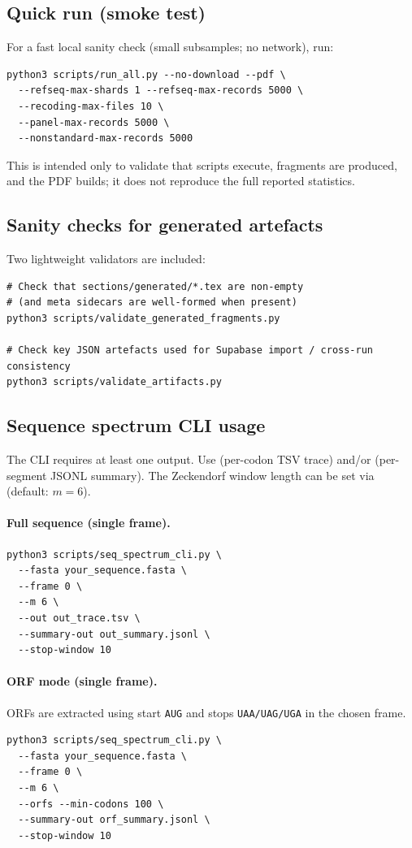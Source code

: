 \subsection{Quick run (smoke test)}
For a fast local sanity check (small subsamples; no network), run:
\begin{verbatim}
python3 scripts/run_all.py --no-download --pdf \
  --refseq-max-shards 1 --refseq-max-records 5000 \
  --recoding-max-files 10 \
  --panel-max-records 5000 \
  --nonstandard-max-records 5000
\end{verbatim}
This is intended only to validate that scripts execute, fragments are produced, and the PDF builds; it does not reproduce the full reported statistics.

\subsection{Sanity checks for generated artefacts}
Two lightweight validators are included:
\begin{verbatim}
# Check that sections/generated/*.tex are non-empty
# (and meta sidecars are well-formed when present)
python3 scripts/validate_generated_fragments.py

# Check key JSON artefacts used for Supabase import / cross-run consistency
python3 scripts/validate_artifacts.py
\end{verbatim}

\subsection{Sequence spectrum CLI usage}
The CLI requires at least one output. Use  (per-codon TSV trace) and/or  (per-segment JSONL summary).
The Zeckendorf window length can be set via  (default: $m=6$).

\paragraph{Full sequence (single frame).}
\begin{verbatim}
python3 scripts/seq_spectrum_cli.py \
  --fasta your_sequence.fasta \
  --frame 0 \
  --m 6 \
  --out out_trace.tsv \
  --summary-out out_summary.jsonl \
  --stop-window 10
\end{verbatim}

\paragraph{ORF mode (single frame).}
ORFs are extracted using start \texttt{AUG} and stops \texttt{UAA/UAG/UGA} in the chosen frame.
\begin{verbatim}
python3 scripts/seq_spectrum_cli.py \
  --fasta your_sequence.fasta \
  --frame 0 \
  --m 6 \
  --orfs --min-codons 100 \
  --summary-out orf_summary.jsonl \
  --stop-window 10
\end{verbatim}

